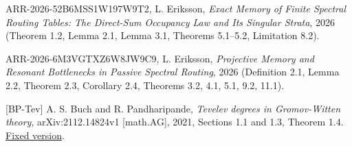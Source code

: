 \documentclass[
  11pt,
  a4paper,
]{article}
\begin{document}
ARR-2026-52B6MSS1W197W9T2, L. Eriksson, \emph{Exact Memory of Finite
Spectral Routing Tables: The Direct-Sum Occupancy Law and Its Singular
Strata}, 2026 (Theorem 1.2, Lemma 2.1, Lemma 3.1, Theorems 5.1--5.2,
Limitation 8.2).

ARR-2026-6M3VGTXZ6W8JW9C9, L. Eriksson, \emph{Projective Memory and
Resonant Bottlenecks in Passive Spectral Routing}, 2026 (Definition 2.1,
Lemma 2.2, Theorem 2.3, Corollary 2.4, Theorems 3.2, 4.1, 5.1, 9.2,
11.1).

{[}BP-Tev{]} A. S. Buch and R. Pandharipande, \emph{Tevelev degrees in
Gromov-Witten theory}, arXiv:2112.14824v1 {[}math.AG{]}, 2021, Sections
1.1 and 1.3, Theorem 1.4.
\href{https://arxiv.org/abs/2112.14824v1}{Fixed version}.
\end{document}
